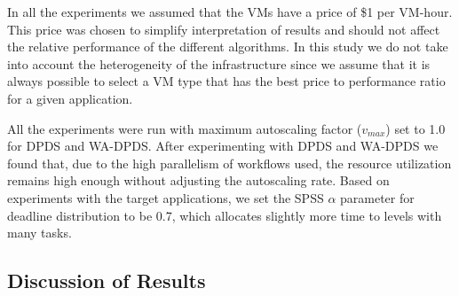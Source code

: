 \documentclass[conference]{IEEEtran}
\begin{document}
In all the experiments we assumed that the VMs have a price of \$1 per VM-hour. This price was chosen to simplify interpretation of results and should not affect the relative performance of the different algorithms. In this study we do not take into account the heterogeneity of the infrastructure since we assume that it is always possible to select a VM type that has the best price to performance ratio for a given application.

All the experiments were run with maximum autoscaling factor ($v_{max}$) set to 1.0 for DPDS and WA-DPDS. After experimenting with DPDS and WA-DPDS we found that, due to the high parallelism of workflows used, the resource utilization remains high enough without adjusting the autoscaling rate. Based on experiments with the target applications, we set the SPSS $\alpha$ parameter for deadline distribution to be 0.7, which allocates slightly more time to levels with many tasks.

\subsection{Discussion of Results}
\end{document}
